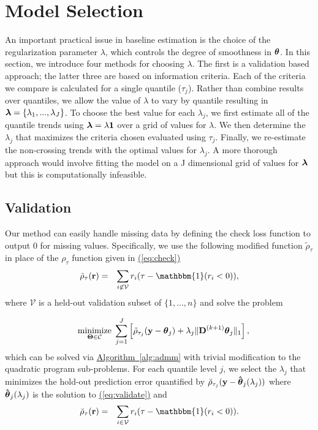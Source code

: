 \documentclass[aoas]{imsart}
\newcommand{\Eqn}[1]{\hyperref[eq:#1]{{\rm (\ref*{eq:#1})}}} %
\newcommand{\Alg}[1]{\hyperref[alg:#1]{Algorithm~\ref*{alg:#1}}} %
\newcommand{\Eqn}[1]{{(\ref{eq:#1})}} %
\newcommand{\Alg}[1]{{Algorithm~\ref{alg:#1}}} %
\newcommand{\One}{\mathbbm{1}}
\newcommand{\V}[1]{{\bm{\mathbf{\MakeLowercase{#1}}}}} %
\newcommand{\VE}[2]{\MakeLowercase{#1}_{#2}} %
\newcommand{\Vhat}[1]{{\bm{\hat \mathbf{\MakeLowercase{#1}}}}} %
\newcommand{\M}[1]{{\bm{\mathbf{\MakeUppercase{#1}}}}} %
\newcommand{\Mn}[2]{\M{#1}^{(#2)}} %
\begin{document}
\section{Model Selection}
\label{sec:lambda_choice}

An important practical issue in baseline estimation is the choice of the regularization parameter $\lambda$, which controls the degree of smoothness in $\V{\theta}$. In this section, we introduce four methods for choosing $\lambda$. The first is a validation based approach; the latter three are based on information criteria. Each of the criteria we compare is calculated for a single quantile ($\tau_j$). Rather than combine results over quantiles, we allow the value of $\lambda$ to vary by quantile resulting in $\V{\lambda} = \{\lambda_1, ..., \lambda_J\}$. To choose the best value for each $\lambda_j$, we first estimate all of the quantile trends using $\V{\lambda} = \lambda\mathbf{1}$ over a grid of values for $\lambda$. We then determine the $\lambda_j$ that maximizes the criteria chosen evaluated using $\tau_j$. Finally, we re-estimate the non-crossing trends with the optimal values for $\lambda_j$. A more thorough approach would involve fitting the model on a J dimensional grid of values for $\V{\lambda}$ but this is computationally infeasible.      

\subsection{Validation}
Our method can easily handle missing data by defining the check loss function to output 0 for missing values. %
Specifically, we use the following modified function $\tilde{\rho}_\tau$ in place of the $\rho_\tau$ function given in \Eqn{check}
\begin{eqnarray}
\label{eq:modcheck}
\tilde{\rho}_{\tau}(\V{r}) & = & \sum_{i \not\in \mathcal{V}} \VE{r}{i}(\tau-\One(\VE{r}{i}<0)),
\end{eqnarray}
where $\mathcal{V}$ is a held-out validation subset of $\{1, \ldots, n\}$ and solve the problem

\begin{eqnarray}
\label{eq:validate}
&&\underset{\M{\Theta} \in \mathcal{C}}{\text{minimize}}\; \sum_{j=1}^J \left [\tilde{\rho}_{\tau_j}(\V{y} - \V{\theta}_{j}) +
\lambda_j \lVert \Mn{D}{k+1} \V{\theta}_j \rVert_1 \right ],
\end{eqnarray}
which can be solved via \Alg{admm} with trivial modification to the quadratic program sub-problems. For each quantile level $j$, we select the $\lambda_j$ that minimizes the hold-out prediction error quantified by $\breve{\rho}_{\tau_j}(\V{y} - \Vhat{\theta}_j(\lambda_j))$ where $\Vhat{\theta}_j(\lambda_j)$ is the solution to \Eqn{validate} and
\begin{eqnarray*}
	\breve{\rho}_{\tau}(\V{r}) & = & \sum_{i \in \mathcal{V}} \VE{r}{i}(\tau-\One(\VE{r}{i}<0)).
\end{eqnarray*}
\end{document}
